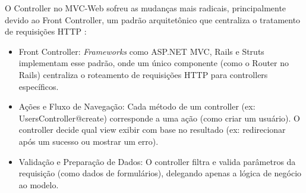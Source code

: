        \par O Controller no MVC-Web sofreu as mudanças mais radicais, principalmente devido ao Front Controller, um padrão arquitetônico que centraliza o tratamento de requisições HTTP \cite{inproceedings:grove:2011}:
    
        \begin{itemize}
            \item Front Controller: \textit{Frameworks} como ASP.NET MVC, Rails e Struts implementam esse padrão, onde um único componente (como o Router no Rails) centraliza o roteamento de requisições HTTP para controllers específicos.
    
            \item Ações e Fluxo de Navegação: Cada método de um controller (ex: UsersController@create) corresponde a uma ação (como criar um usuário). O controller decide qual view exibir com base no resultado (ex: redirecionar após um sucesso ou mostrar um erro).
    
            \item Validação e Preparação de Dados: O controller filtra e valida parâmetros da requisição (como dados de formulários), delegando apenas a lógica de negócio ao modelo.            
        \end{itemize}
